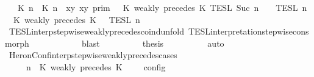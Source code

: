 \begin{isabellebody}
\ {\isacartoucheopen}{\isasymlbrakk}\ {\isasymlceil}{\isacharhash}\isactrlsup {\isasymle}\ K\ n{\isacharcomma}\ {\isacharhash}\isactrlsup {\isasymle}\ K\ n{\isasymrceil}\ {\isasymin}\ {\isacharparenleft}{\isasymlambda}{\isacharparenleft}x{\isacharcomma}y{\isacharparenright}{\isachardot}\ x{\isasymle}y{\isacharparenright}\ {\isasymrbrakk}\isactrlsub p\isactrlsub r\isactrlsub i\isactrlsub m\ {\isasyminter}\ {\isasymlbrakk}\ K\ weakly\ precedes\ K\ {\isasymrbrakk}\isactrlsub T\isactrlsub E\isactrlsub S\isactrlsub L\isactrlbsup {\isasymge}\ Suc\ n\isactrlesup \ {\isasyminter}\ {\isasymlbrakk}{\isasymlbrakk}\ {\isasymPsi}\ {\isasymrbrakk}{\isasymrbrakk}\isactrlsub T\isactrlsub E\isactrlsub S\isactrlsub L\isactrlbsup {\isasymge}\ n\isactrlesup \ {\isacharequal}\ {\isasymlbrakk}{\isasymlbrakk}\ {\isacharparenleft}K\ weakly\ precedes\ K\ {\isacharhash}\ {\isasymPsi}\ {\isasymrbrakk}{\isasymrbrakk}\isactrlsub T\isactrlsub E\isactrlsub S\isactrlsub L\isactrlbsup {\isasymge}\ n\isactrlesup {\isacartoucheclose}\isanewline
\ \ \ \ \ \ \ \ \isamarkupfalse%
\ TESL{\isacharunderscore}interp{\isacharunderscore}stepwise{\isacharunderscore}weakly{\isacharunderscore}precedes{\isacharunderscore}coind{\isacharunderscore}unfold\ TESL{\isacharunderscore}interpretation{\isacharunderscore}stepwise{\isacharunderscore}cons{\isacharunderscore}morph\isanewline
\ \ \ \ \ \ \ \ \ \ \isamarkupfalse%
\ blast\isanewline
\ \ \ \ \ \ \isamarkupfalse%
\ \isamarkupfalse%
\ {\isacharquery}thesis\isanewline
\ \ \ \ \ \ \ \ \isamarkupfalse%
\ auto\isanewline
\ \ \ \ \isamarkupfalse%
\isanewline
\ \ \isamarkupfalse%
%
\endisatagproof
{\isafoldproof}%
%
\isadelimproof
\isanewline
%
\endisadelimproof
\isanewline
{}\isamarkupfalse%
\ HeronConf{\isacharunderscore}interp{\isacharunderscore}stepwise{\isacharunderscore}weakly{\isacharunderscore}precedes{\isacharunderscore}cases{\isacharprime}{\isacharcolon}\isanewline
\ \ \ {\isacartoucheopen}{\isasymlbrakk}\ {\isasymGamma}{\isacharcomma}\ n\ {\isasymturnstile}\ {\isacharparenleft}{\isacharparenleft}K\ weakly\ precedes\ K\ {\isacharhash}\ {\isasymPsi}{\isacharparenright}\ {\isasymtriangleright}\ {\isasymPhi}\ {\isasymrbrakk}\isactrlsub c\isactrlsub o\isactrlsub n\isactrlsub f\isactrlsub i\isactrlsub g\isanewline

\end{isabellebody}
